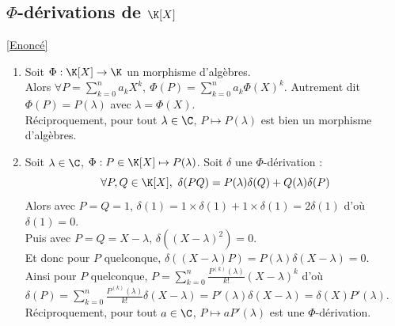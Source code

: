 \documentclass[8pt]{book}
\begin{document}
	\subsection{$\Phi$-dérivations de $\K[X]$ }
	\label{Phi-dérivations des polynômes corrigé}
	\textcolor{blue}{\hyperref[Phi-dérivations des polynômes]{[Enoncé]}}\\
	\begin{enumerate}[leftmargin=*]
		\item Soit $\Phi:\K[X]\to \K$ un morphisme d'algèbres.\\
		Alors $\forall P=\displaystyle\sum_{k=0}^na_kX^k,\ \Phi(P)=\sum_{k=0}^na_k\Phi(X)^k$. Autrement dit $\Phi(P)=P(\lambda)$ avec $\lambda=\Phi(X)$.\\
		Réciproquement, pour tout $\lambda\in \C$, $P\mapsto P(\lambda)$ est bien un morphisme d'algèbres.
		\item Soit $\lambda\in \C$, $\Phi:P\in \K[X]\mapsto P(\lambda)$. Soit $\delta$ une $\Phi$-dérivation :
		$$\forall P,Q\in \K[X],\ \delta(PQ)=P(\lambda)\delta(Q)+Q(\lambda)\delta(P)$$
		Alors avec $P=Q=1$, $\delta(1)=1\times\delta(1)+1\times\delta(1)=2\delta(1)$ d'où $\delta(1)=0$.\\
		Puis avec $P=Q=X-\lambda$, $\delta((X-\lambda)^2)=0$.\\
		Et donc pour $P$ quelconque, $\delta((X-\lambda)P)=P(\lambda)\delta(X-\lambda)=0$.\\
		Ainsi pour $P$ quelconque, $P=\displaystyle\sum_{k=0}^n\frac{P^{(k)}(\lambda)}{k!}(X-\lambda)^k$ d'où $\delta(P)=\displaystyle\sum_{k=0}^n\frac{P^{(k)}(\lambda)}{k!}\delta(X-\lambda)=P'(\lambda)\delta(X-\lambda)=\delta(X)P'(\lambda)$.\\
		Réciproquement, pour tout $a\in \C$, $P\mapsto aP'(\lambda)$ est une $\Phi$-dérivation.
	\end{enumerate}
	
\end{document}
